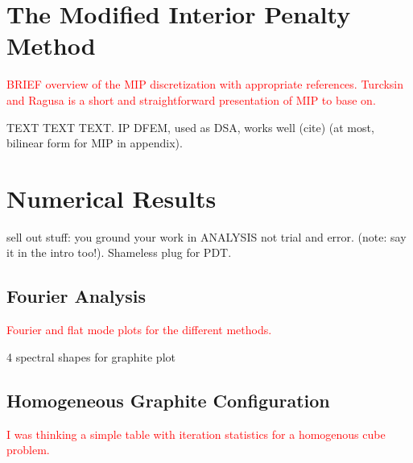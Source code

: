 \documentclass[preprint,10pt]{elsarticle}
\newcommand{\tcr}[1]{\textcolor{red}{#1}}
\begin{document}
\section{The Modified Interior Penalty Method} \label{sec::MIP}

\tcr{BRIEF overview of the MIP discretization with appropriate references. Turcksin and Ragusa is a short and straightforward presentation of MIP to base on.}

TEXT TEXT TEXT. IP DFEM, used as DSA, works well (cite) (at most, bilinear form for MIP in appendix).

\section{Numerical Results} \label{sec::results}
sell out stuff: you ground your work in ANALYSIS not trial and error. (note: say it in the intro too!). Shameless plug for PDT.

\subsection{Fourier Analysis}
\tcr{Fourier and flat mode plots for the different methods.}


4 spectral shapes for graphite plot

\subsection{Homogeneous Graphite Configuration}
\tcr{I was thinking a simple table with iteration statistics for a homogenous cube problem.}
\end{document}
